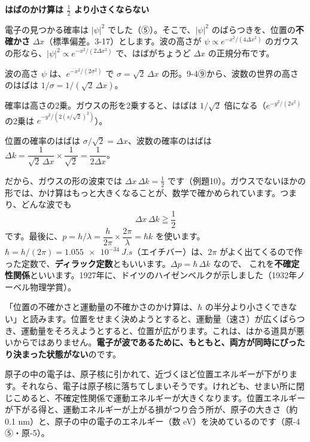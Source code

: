 \noindent\textbf{はばのかけ算は $\tfrac12$ より小さくならない}\par\nobreak
電子の見つかる確率は $|\psi|^2$ でした（⑤）。そこで、$|\psi|^2$ のばらつきを、位置の\textbf{不確かさ} $\Delta x$（標準偏差。3-17）とします。波の高さが $\psi\propto e^{-x^2/(4\Delta x^2)}$ のガウスの形なら、$|\psi|^2\propto e^{-x^2/(2\Delta x^2)}$ で、はばがちょうど $\Delta x$ の正規分布です。
\begin{enumerate}[label={\bkcircled[bkGreen]{\arabic*}}, leftmargin=2.4\zw, itemsep=1pt, topsep=2pt]
\item 波の高さ $\psi$ は、$e^{-x^2/(2\sigma^2)}$ で $\sigma=\sqrt2\,\Delta x$ の形。9-4⑨から、波数の世界の高さのはばは $1/\sigma=1/(\sqrt2\,\Delta x)$。
\item 確率は高さの2乗。ガウスの形を2乗すると、はばは $1/\sqrt2$ 倍になる（$e^{-y^2/(2s^2)}$ の2乗は $e^{-y^2/(2(s/\sqrt2)^2)}$）。
\item 位置の確率のはばは $\sigma/\sqrt2=\Delta x$、波数の確率のはばは $\Delta k=\dfrac{1}{\sqrt2\,\Delta x}\times\dfrac{1}{\sqrt2}=\dfrac{1}{2\Delta x}$。
\end{enumerate}
だから、ガウスの形の波束では $\Delta x\,\Delta k=\tfrac12$ です（例題10）。ガウスでないほかの形では、かけ算はもっと大きくなることが、数学で確かめられています。つまり、どんな波でも
\[ \Delta x\,\Delta k\geqq\frac12 \]
です。最後に、$p=h/\lambda=\dfrac{h}{2\pi}\times\dfrac{2\pi}{\lambda}=\hbar k$ を使います。$\hbar=h/(2\pi)=\qty{1.055e-34}{J.s}$（エイチバー）は、$2\pi$ がよく出てくるので作った定数で、\textbf{ディラック定数}ともいいます。$\Delta p=\hbar\,\Delta k$ なので、
\label{ph:原-3:fukakutei}これを\textbf{不確定性関係}といいます。1927年に、ドイツのハイゼンベルクが示しました（1932年ノーベル物理学賞）。

\begin{phyomi}
「位置の不確かさと運動量の不確かさのかけ算は、$\hbar$ の半分より小さくできない」と読みます。位置をせまく決めようとすると、運動量（速さ）が広くばらつき、運動量をそろえようとすると、位置が広がります。これは、はかる道具が悪いからではありません。\textbf{電子が波であるために、もともと、両方が同時にぴったり決まった状態がない}のです。
\end{phyomi}

\begin{phmijika}
原子の中の電子は、原子核に引かれて、近づくほど位置エネルギーが下がります。それなら、電子は原子核に落ちてしまいそうです。けれども、せまい所に閉じこめると、不確定性関係で運動エネルギーが大きくなります。位置エネルギーが下がる得と、運動エネルギーが上がる損がつり合う所が、原子の大きさ（約 0.1 nm）と、原子の中の電子のエネルギー（数 eV）を決めているのです（原-4 ⑤・原-5）。
\end{phmijika}

